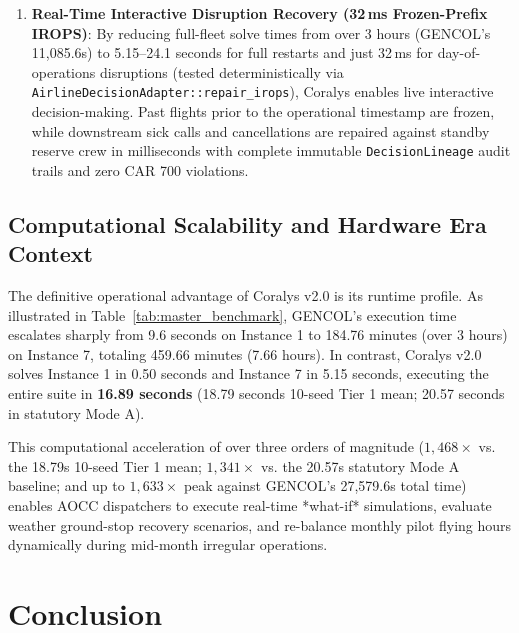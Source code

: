 \documentclass[journal]{IEEEtran}
\begin{document}
\begin{enumerate}
    \item \textbf{Real-Time Interactive Disruption Recovery (32\,ms Frozen-Prefix IROPS)}: By reducing full-fleet solve times from over 3 hours (GENCOL's 11,085.6s) to 5.15--24.1 seconds for full restarts and just 32\,ms for day-of-operations disruptions (tested deterministically via \texttt{AirlineDecisionAdapter::repair\_irops}), Coralys enables live interactive decision-making. Past flights prior to the operational timestamp are frozen, while downstream sick calls and cancellations are repaired against standby reserve crew in milliseconds with complete immutable \texttt{DecisionLineage} audit trails and zero CAR 700 violations.
\end{enumerate}

\subsection{Computational Scalability and Hardware Era Context}

The definitive operational advantage of Coralys v2.0 is its runtime profile. As illustrated in Table~\ref{tab:master_benchmark}, GENCOL's execution time escalates sharply from 9.6 seconds on Instance 1 to 184.76 minutes (over 3 hours) on Instance 7, totaling 459.66 minutes (7.66 hours). In contrast, Coralys v2.0 solves Instance 1 in 0.50 seconds and Instance 7 in 5.15 seconds, executing the entire suite in \textbf{16.89 seconds} (18.79 seconds 10-seed Tier 1 mean; 20.57 seconds in statutory Mode A).

This computational acceleration of over three orders of magnitude ($1,468\times$ vs. the 18.79s 10-seed Tier 1 mean; $1,341\times$ vs. the 20.57s statutory Mode A baseline; and up to $1,633\times$ peak against GENCOL's 27,579.6s total time) enables AOCC dispatchers to execute real-time *what-if* simulations, evaluate weather ground-stop recovery scenarios, and re-balance monthly pilot flying hours dynamically during mid-month irregular operations.

\section{Conclusion}
\end{document}
